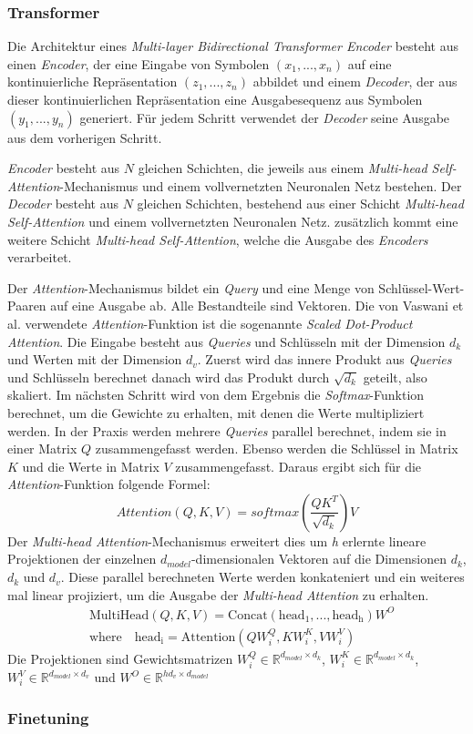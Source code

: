 \subsubsection{Transformer}
Die Architektur eines \textit{Multi-layer Bidirectional Transformer Encoder} besteht aus einen \textit{Encoder}, der eine Eingabe von Symbolen $(x_1,...,x_n)$ auf eine kontinuierliche Repräsentation $(z_1,...,z_n)$ abbildet 
und einem \textit{Decoder}, der aus dieser kontinuierlichen Repräsentation eine Ausgabesequenz aus Symbolen $(y_1,...,y_n)$ generiert. Für jedem Schritt verwendet der 
\textit{Decoder} seine Ausgabe aus dem vorherigen Schritt. \par
\textit{Encoder} besteht aus $N$ gleichen Schichten, die jeweils aus einem \textit{Multi-head Self-Attention}-Mechanismus und einem vollvernetzten Neuronalen Netz bestehen.
Der \textit{Decoder} besteht aus $N$ gleichen Schichten, bestehend aus einer Schicht \textit{Multi-head Self-Attention} und einem vollvernetzten Neuronalen Netz. zusätzlich kommt eine weitere Schicht \textit{Multi-head Self-Attention},
welche die Ausgabe des \textit{Encoders} verarbeitet. \par
Der \textit{Attention}-Mechanismus \cite{vaswani2017attention} bildet ein \textit{Query} und eine Menge von Schlüssel-Wert-Paaren auf eine Ausgabe ab. Alle Bestandteile sind Vektoren.
Die von Vaswani et al. verwendete \textit{Attention}-Funktion ist die sogenannte \textit{Scaled Dot-Product Attention}. Die Eingabe besteht aus \textit{Queries} und Schlüsseln mit der Dimension $d_k$ und Werten mit der Dimension $d_v$.
Zuerst wird das innere Produkt aus \textit{Queries} und Schlüsseln berechnet danach wird das Produkt durch $\sqrt{d_k}$ geteilt, also skaliert. Im nächsten Schritt wird von dem Ergebnis die \textit{Softmax}-Funktion berechnet, um die Gewichte zu erhalten, mit denen die Werte multipliziert werden. 
In der Praxis werden mehrere \textit{Queries} parallel berechnet, indem sie in einer Matrix $Q$ zusammengefasst werden. Ebenso werden die Schlüssel in Matrix $K$ und die Werte in Matrix $V$ zusammengefasst.
Daraus ergibt sich für die \textit{Attention}-Funktion folgende Formel:
\begin{equation*}
Attention(Q,K,V) = softmax(\frac{QK^T}{\sqrt{d_k}})V    
\end{equation*}
Der \textit{Multi-head Attention}-Mechanismus erweitert dies um \textit{h} erlernte lineare Projektionen der einzelnen $d_{model}$-dimensionalen Vektoren auf die Dimensionen $d_k$, $d_k$ und $d_v$. 
Diese parallel berechneten Werte werden konkateniert und ein weiteres mal linear projiziert, um die Ausgabe der \textit{Multi-head Attention} zu erhalten.
\begin{align*}
   & \mathrm{MultiHead}(Q,K,V) = \mathrm{Concat}(\mathrm{head_1},...,\mathrm{head_h})W^O \\
   & \mathrm{where} \quad \mathrm{head_i} = \mathrm{Attention}(QW_i^Q,KW_i^K,VW_i^V)
\end{align*}
Die Projektionen sind Gewichtsmatrizen $W_i^Q \in \mathbb{R}^{d_{model}\times d_k}$, $W_i^K \in \mathbb{R}^{d_{model}\times d_k}$, $W_i^V \in \mathbb{R}^{d_{model}\times d_v}$ und $W^O \in \mathbb{R}^{hd_v\times d_{model}}$
\subsubsection{Finetuning}

